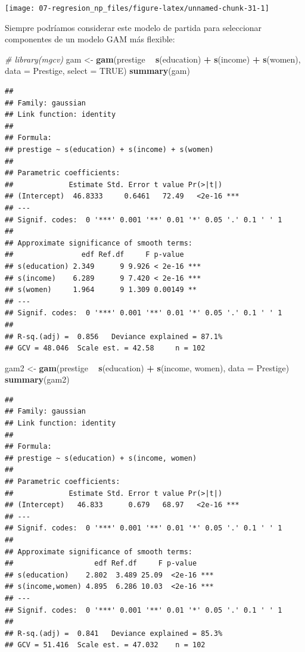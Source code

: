 \documentclass[
]{book}
\newenvironment{Shaded}{\begin{snugshade}}{\end{snugshade}}
\newcommand{\CommentTok}[1]{\textcolor[rgb]{0.56,0.35,0.01}{\textit{#1}}}
\newcommand{\DataTypeTok}[1]{\textcolor[rgb]{0.13,0.29,0.53}{#1}}
\newcommand{\KeywordTok}[1]{\textcolor[rgb]{0.13,0.29,0.53}{\textbf{#1}}}
\newcommand{\NormalTok}[1]{#1}
\newcommand{\OperatorTok}[1]{\textcolor[rgb]{0.81,0.36,0.00}{\textbf{#1}}}
\newcommand{\OtherTok}[1]{\textcolor[rgb]{0.56,0.35,0.01}{#1}}
\newcommand{\StringTok}[1]{\textcolor[rgb]{0.31,0.60,0.02}{#1}}
\theoremstyle{break}
\theoremstyle{definition}
\theoremstyle{definition}
\theoremstyle{definition}
\theoremstyle{remark}
\begin{document}
\begin{center}\texttt{[image: 07-regresion\_np\_files/figure-latex/unnamed-chunk-31-1]} \end{center}

Siempre podríamos considerar este modelo de partida para seleccionar componentes de un modelo GAM más flexible:

\begin{Shaded}
\begin{Highlighting}[]
\CommentTok{# library(mgcv)}
\NormalTok{gam <-}\StringTok{ }\KeywordTok{gam}\NormalTok{(prestige }\OperatorTok{~}\StringTok{ }\KeywordTok{s}\NormalTok{(education) }\OperatorTok{+}\StringTok{ }\KeywordTok{s}\NormalTok{(income) }\OperatorTok{+}\StringTok{ }\KeywordTok{s}\NormalTok{(women), }\DataTypeTok{data =}\NormalTok{ Prestige, }\DataTypeTok{select =} \OtherTok{TRUE}\NormalTok{)}
\KeywordTok{summary}\NormalTok{(gam)}
\end{Highlighting}
\end{Shaded}

\begin{verbatim}
## 
## Family: gaussian 
## Link function: identity 
## 
## Formula:
## prestige ~ s(education) + s(income) + s(women)
## 
## Parametric coefficients:
##             Estimate Std. Error t value Pr(>|t|)    
## (Intercept)  46.8333     0.6461   72.49   <2e-16 ***
## ---
## Signif. codes:  0 '***' 0.001 '**' 0.01 '*' 0.05 '.' 0.1 ' ' 1
## 
## Approximate significance of smooth terms:
##                edf Ref.df     F p-value    
## s(education) 2.349      9 9.926 < 2e-16 ***
## s(income)    6.289      9 7.420 < 2e-16 ***
## s(women)     1.964      9 1.309 0.00149 ** 
## ---
## Signif. codes:  0 '***' 0.001 '**' 0.01 '*' 0.05 '.' 0.1 ' ' 1
## 
## R-sq.(adj) =  0.856   Deviance explained = 87.1%
## GCV = 48.046  Scale est. = 42.58     n = 102
\end{verbatim}

\begin{Shaded}
\begin{Highlighting}[]
\NormalTok{gam2 <-}\StringTok{ }\KeywordTok{gam}\NormalTok{(prestige }\OperatorTok{~}\StringTok{ }\KeywordTok{s}\NormalTok{(education) }\OperatorTok{+}\StringTok{ }\KeywordTok{s}\NormalTok{(income, women), }\DataTypeTok{data =}\NormalTok{ Prestige)}
\KeywordTok{summary}\NormalTok{(gam2)}
\end{Highlighting}
\end{Shaded}

\begin{verbatim}
## 
## Family: gaussian 
## Link function: identity 
## 
## Formula:
## prestige ~ s(education) + s(income, women)
## 
## Parametric coefficients:
##             Estimate Std. Error t value Pr(>|t|)    
## (Intercept)   46.833      0.679   68.97   <2e-16 ***
## ---
## Signif. codes:  0 '***' 0.001 '**' 0.01 '*' 0.05 '.' 0.1 ' ' 1
## 
## Approximate significance of smooth terms:
##                   edf Ref.df     F p-value    
## s(education)    2.802  3.489 25.09  <2e-16 ***
## s(income,women) 4.895  6.286 10.03  <2e-16 ***
## ---
## Signif. codes:  0 '***' 0.001 '**' 0.01 '*' 0.05 '.' 0.1 ' ' 1
## 
## R-sq.(adj) =  0.841   Deviance explained = 85.3%
## GCV = 51.416  Scale est. = 47.032    n = 102
\end{verbatim}
\end{document}
